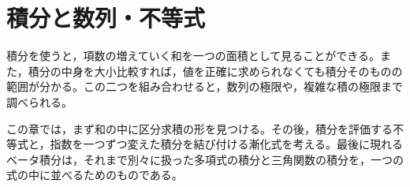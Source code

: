 \chapter{積分と数列・不等式}\label{章:積分と数列}

積分を使うと，項数の増えていく和を一つの面積として見ることができる。また，積分の中身を大小比較すれば，値を正確に求められなくても積分そのものの範囲が分かる。この二つを組み合わせると，数列の極限や，複雑な積の極限まで調べられる。

この章では，まず和の中に区分求積の形を見つける。その後，積分を評価する不等式と，指数を一つずつ変えた積分を結び付ける漸化式を考える。最後に現れるベータ積分は，それまで別々に扱った多項式の積分と三角関数の積分を，一つの式の中に並べるためのものである。

%
%
%
%
%
%
%
